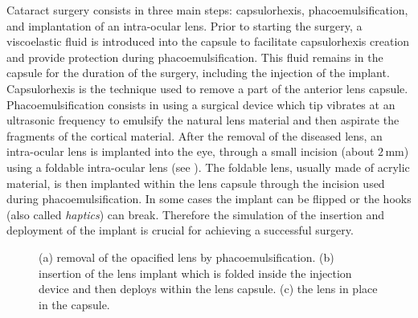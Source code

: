Cataract surgery consists in three main steps: capsulorhexis, phacoemulsification, and implantation of an intra-ocular lens. Prior to starting the surgery, a viscoelastic fluid is introduced into the capsule to facilitate capsulorhexis creation and provide protection during phacoemulsification. This fluid remains in the capsule for the duration of the surgery, including the injection of the implant. Capsulorhexis is the technique used to remove a part of the anterior lens capsule. Phacoemulsification consists in using a surgical device which tip vibrates at an ultrasonic frequency to emulsify the natural lens material and then aspirate the fragments of the cortical material. After the removal of the diseased lens, an intra-ocular lens is implanted into the eye, through a small incision (about $2\,$mm) using a foldable intra-ocular lens (see ). The foldable lens, usually made of acrylic material, is then implanted within the lens capsule through the incision used during phacoemulsification. In some cases the implant can be flipped or  the hooks (also called \emph{haptics}) can break. Therefore the simulation of the insertion and deployment of the implant is crucial for achieving a successful surgery.
%
\begin{figure}[ht]
\centering 
{}
\hspace{1cm} 
\hspace{1cm} 
\caption [Steps of cataract surgery] {(a) removal of the opacified lens by phacoemulsification. (b) insertion of the lens implant which is folded inside the injection device and then deploys within the lens capsule. (c) the lens in place in the capsule.}
\label{chap8:fig-surgery}
\end{figure}

